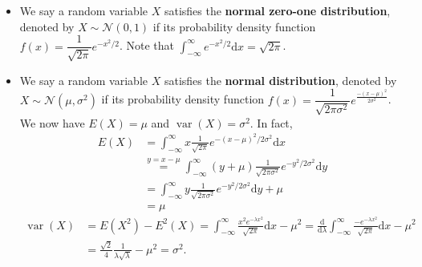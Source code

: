 \documentclass[11pt,singlecolumn, openany, citestyle=authoryear]{elegantbook}
\begin{document}
\begin{CJK}{UTF8}{gbsn}
\begin{example} 
    \begin{itemize}
    \item We say a random variable $X$ satisfies the \textbf{normal zero-one distribution}, 
    denoted by $X\sim \mathcal{N}(0,1)$ if 
    its probability density function $f(x)=\dfrac{1}{\sqrt{2\pi}}e^{-x^2/2}$.
    Note that $\displaystyle \int_{-\infty}^\infty e^{-x^2/2}\mathrm{d}x = \sqrt{2\pi}$.
    \item  We say a random variable $X$ satisfies the \textbf{normal distribution}, 
    denoted by $X\sim \mathcal{N}(\mu,\sigma^2)$ if 
    its probability density function $f(x)=\dfrac{1}{\sqrt{2\pi\sigma^2}}
    e^\frac{-(x-\mu)^2}{2\sigma^2}$.
    We now have $E(X)=\mu$ and $\operatorname{var}(X)=\sigma^2$.
    In fact, 
    \begin{align*}
    E(X)&=\int_{-\infty}^\infty x\frac{1}{\sqrt{2\pi}}e^{-(x-\mu)^2/2\sigma^2}\mathrm{d}x\\
    &\overset{y=x-\mu}{=}\int_{-\infty}^\infty (y+\mu)\frac{1}{\sqrt{2\pi\sigma^2}}e^{-y^2/2\sigma^2}
    \mathrm{d}y\\
    &=\int_{-\infty}^\infty y\frac{1}{\sqrt{2\pi\sigma^2}}e^{-y^2/2\sigma^2}\mathrm{d}y+  
    \mu\\ 
    &= \mu    
    \end{align*}
    \begin{align*}
    \operatorname*{var}(X)&=E(X^2)-E^2(X)=
    \int_{-\infty}^\infty \frac{x^2 e^{-\lambda x^2}}{\sqrt{2\pi}}\mathrm{d}x-\mu^2 = 
    \frac{\mathrm{d}}{\mathrm{d}\lambda}\int_{-\infty}^\infty \frac{-e^{-\lambda x^2}}{\sqrt{2\pi}}\mathrm{d}x
    -\mu^2\\
    &=\frac{\sqrt{2}}{4}\frac{1}{\lambda\sqrt{\lambda}}-\mu^2=\sigma^2.
    \end{align*}
\end{itemize}
\end{example}


\end{CJK}
\end{document}
